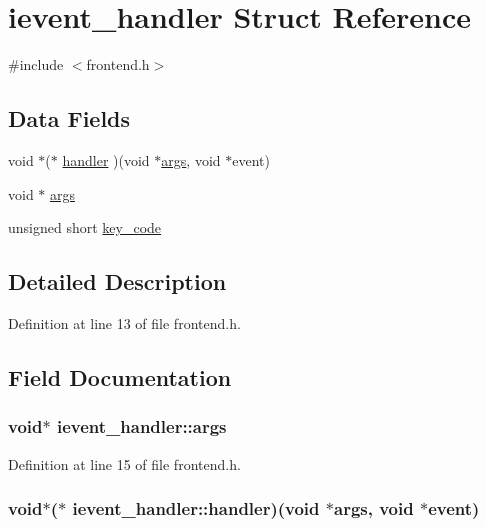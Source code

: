 \hypertarget{structievent__handler}{\section{ievent\-\_\-handler Struct Reference}
\label{structievent__handler}
}


{\ttfamily \#include $<$frontend.\-h$>$}

\subsection*{Data Fields}
\begin{DoxyCompactItemize}
\item 
void $\ast$($\ast$ \hyperlink{structievent__handler_a320eaffc01d119279ead9c5ad877c6da}{handler} )(void $\ast$\hyperlink{structievent__handler_ac6b4e6b5b95ada7b0d9985f738ffe1e5}{args}, void $\ast$event)
\item 
void $\ast$ \hyperlink{structievent__handler_ac6b4e6b5b95ada7b0d9985f738ffe1e5}{args}
\item 
unsigned short \hyperlink{structievent__handler_af2766b148965989b8d202b11b9e72f60}{key\-\_\-code}
\end{DoxyCompactItemize}


\subsection{Detailed Description}


Definition at line 13 of file frontend.\-h.



\subsection{Field Documentation}
\hypertarget{structievent__handler_ac6b4e6b5b95ada7b0d9985f738ffe1e5}{
\subsubsection[{args}]{\setlength{\rightskip}{0pt plus 5cm}void$\ast$ ievent\-\_\-handler\-::args}}\label{structievent__handler_ac6b4e6b5b95ada7b0d9985f738ffe1e5}


Definition at line 15 of file frontend.\-h.

\hypertarget{structievent__handler_a320eaffc01d119279ead9c5ad877c6da}{
\subsubsection[{handler}]{\setlength{\rightskip}{0pt plus 5cm}void$\ast$($\ast$ ievent\-\_\-handler\-::handler)(void $\ast${\bf args}, void $\ast$event)}}\label{structievent__handler_a320eaffc01d119279ead9c5ad877c6da}


